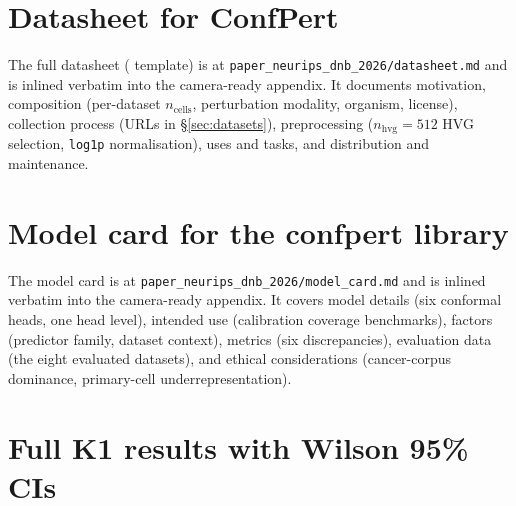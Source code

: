 \documentclass[11pt]{article}
\begin{document}



\appendix

\section{Datasheet for ConfPert}
\label{sec:datasheet}

The full datasheet
(\citet{gebru2021datasheets} template) is at
\texttt{paper\_neurips\_dnb\_2026/datasheet.md} and is inlined verbatim
into the camera-ready appendix. It documents motivation, composition
(per-dataset $n_\text{cells}$, perturbation modality, organism,
license), collection process (URLs in \S\ref{sec:datasets}),
preprocessing ($n_\text{hvg} = 512$ HVG selection, \texttt{log1p}
normalisation), uses and tasks, and distribution and maintenance.

\section{Model card for the confpert library}
\label{sec:modelcard}

The model card is at \texttt{paper\_neurips\_dnb\_2026/model\_card.md}
and is inlined verbatim into the camera-ready appendix. It covers
model details (six conformal heads, one head level), intended use
(calibration coverage benchmarks), factors (predictor family, dataset
context), metrics (six discrepancies), evaluation data (the eight
evaluated datasets), and ethical considerations (cancer-corpus
dominance, primary-cell underrepresentation).

\section{Full K1 results with Wilson 95\% CIs}
\label{sec:k1full}
\end{document}
